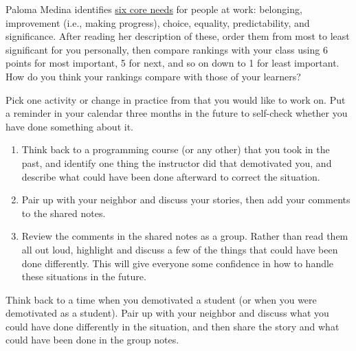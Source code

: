
Paloma Medina identifies
\href{https://www.palomamedina.com/biceps}{six core needs} for people
at work: belonging, improvement (i.e., making progress), choice,
equality, predictability, and significance.  After reading her
description of these, order them from most to least significant for
you personally, then compare rankings with your class using 6 points
for most important, 5 for next, and so on down to 1 for least
important.  How do you think your rankings compare with those of your
learners?


Pick one activity or change in practice from \cite{Lee2017} that you
would like to work on. Put a reminder in your calendar three months in
the future to self-check whether you have done something about it.


\begin{enumerate}

\item
  Think back to a programming course (or any other) that you took in the
  past, and identify one thing the instructor did that demotivated you,
  and describe what could have been done afterward to correct the
  situation.

\item
  Pair up with your neighbor and discuss your stories, then add your
  comments to the shared notes.

\item
  Review the comments in the shared notes as a group. Rather than read
  them all out loud, highlight and discuss a few of the things that
  could have been done differently. This will give everyone some
  confidence in how to handle these situations in the future.

\end{enumerate}


Think back to a time when you demotivated a student (or when you were
demotivated as a student). Pair up with your neighbor and discuss what
you could have done differently in the situation, and then share the
story and what could have been done in the group notes.


